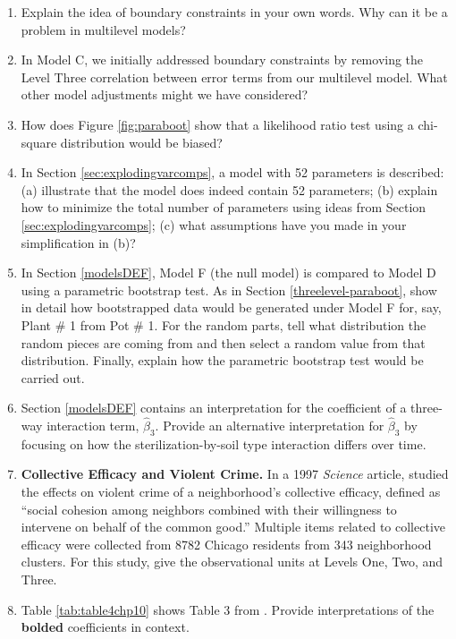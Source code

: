 \documentclass[
]{krantz}
\begin{document}
\begin{enumerate}
\item
  Explain the idea of boundary constraints in your own words. Why can it be a problem in multilevel models?
\item
  In Model C, we initially addressed boundary constraints by removing the Level Three correlation between error terms from our multilevel model. What other model adjustments might we have considered?
\item
  How does Figure \ref{fig:paraboot} show that a likelihood ratio test using a chi-square distribution would be biased?
\item
  In Section \ref{sec:explodingvarcomps}, a model with 52 parameters is described: (a) illustrate that the model does indeed contain 52 parameters; (b) explain how to minimize the total number of parameters using ideas from Section \ref{sec:explodingvarcomps}; (c) what assumptions have you made in your simplification in (b)?
\item
  In Section \ref{modelsDEF}, Model F (the null model) is compared to Model D using a parametric bootstrap test. As in Section \ref{threelevel-paraboot}, show in detail how bootstrapped data would be generated under Model F for, say, Plant \# 1 from Pot \# 1. For the random parts, tell what distribution the random pieces are coming from and then select a random value from that distribution. Finally, explain how the parametric bootstrap test would be carried out.
\item
  Section \ref{modelsDEF} contains an interpretation for the coefficient of a three-way interaction term, \(\hat{\beta}_{3}\). Provide an alternative interpretation for \(\hat{\beta}_{3}\) by focusing on how the sterilization-by-soil type interaction differs over time.
\item
  \textbf{Collective Efficacy and Violent Crime.} In a 1997 \emph{Science} article, \citet{Sampson1997} studied the effects on violent crime of a neighborhood's collective efficacy, defined as ``social cohesion among neighbors combined with their willingness to intervene on behalf of the common good.'' Multiple items related to collective efficacy were collected from 8782 Chicago residents from 343 neighborhood clusters. For this study, give the observational units at Levels One, Two, and Three.
\item
  Table \ref{tab:table4chp10} shows Table 3 from \citet{Sampson1997}. Provide interpretations of the \textbf{bolded} coefficients in context.
\end{enumerate}
\end{document}
